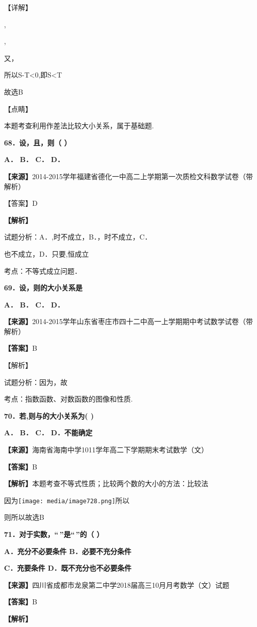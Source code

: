 【详解】

,

,

又，

所以S-T\textless0,即S\textless T

故选B

【点睛】

本题考查利用作差法比较大小关系，属于基础题.

\textbf{68．设，且，则（ ）}

\textbf{A． B． C． D．}

\textbf{【来源】}2014-2015学年福建省德化一中高二上学期第一次质检文科数学试卷（带解析）

【答案】D

\textbf{【解析】}

试题分析：A．,时不成立，B．，时不成立，C．

也不成立，D．只要,恒成立

考点：不等式成立问题．

\textbf{69．设，则的大小关系是}

\textbf{A． B． C． D．}

\textbf{【来源】}2014-2015学年山东省枣庄市四十二中高一上学期期中考试数学试卷（带解析）

\textbf{【答案】}B

【解析】

试题分析：因为，故

考点：指数函数、对数函数的图像和性质.

\textbf{70．若,则与的大小关系为( )}

\textbf{A． B． C． D．不能确定}

\textbf{【来源】}海南省海南中学1011学年高二下学期期末考试数学（文）

\textbf{【答案】}B

\textbf{【解析】}本题考查不等式性质；比较两个数的大小的方法：比较法

因为\texttt{[image: media/image728.png]}所以

则所以故选B

\textbf{71．对于实数，``\,''是``\,''的（ ）}

\textbf{A．充分不必要条件 B．必要不充分条件}

\textbf{C．充要条件 D．既不充分也不必要条件}

\textbf{【来源】}四川省成都市龙泉第二中学2018届高三10月月考数学（文）试题

\textbf{【答案】}B

\textbf{【解析】}

